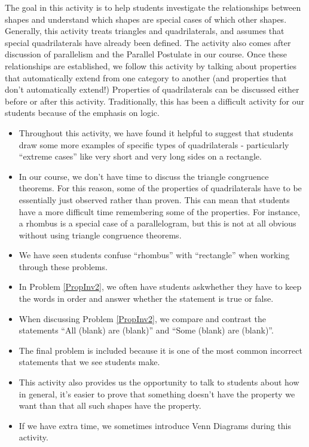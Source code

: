 \documentclass{ximera}
\begin{document}
\newpage
\begin{instructorNotes}
The goal in this activity is to help students investigate the relationships between shapes and understand which shapes are special cases of which other shapes.  Generally, this activity treats triangles and quadrilaterals, and assumes that special quadrilaterals have already been defined.  The activity also comes after discussion of parallelism and the Parallel Postulate in our course.  Once these relationships are established, we follow this activity by talking about properties that automatically extend from one category to another (and properties that don't automatically extend!)  Properties of quadrilaterals can be discussed either before or after this activity.  Traditionally, this has been a difficult activity for our students because of the emphasis on logic.



\begin{itemize}
    \item Throughout this activity, we have found it helpful to suggest that students draw some more examples of specific types of quadrilaterals - particularly ``extreme cases'' like very short and very long sides on a rectangle.
    \item In our course, we don't have time to discuss the triangle congruence theorems. For this reason, some of the properties of quadrilaterals have to be essentially just observed rather than proven.  This can mean that students have a more difficult time remembering some of the properties.  For instance, a rhombus is a special case of a parallelogram, but this is not at all obvious without using triangle congruence theorems.
    \item We have seen students confuse ``rhombus'' with ``rectangle'' when working through these problems.
    \item In Problem \ref{PropInv2}, we often have students askwhether they have to keep the words in order and answer whether the statement is true or false.  
    \item When discussing Problem \ref{PropInv2}, we compare and contrast the statements ``All (blank) are (blank)'' and ``Some (blank) are (blank)''.
    \item The final problem is included because it is one of the most common incorrect statements that we see students make.
    \item This activity also provides us the opportunity to talk to students about how in general, it's easier to prove that something doesn't have the property we want than that all such shapes have the property.  
    \item If we have extra time, we sometimes introduce Venn Diagrams during this activity.
\end{itemize}

\end{instructorNotes}
\end{document}
